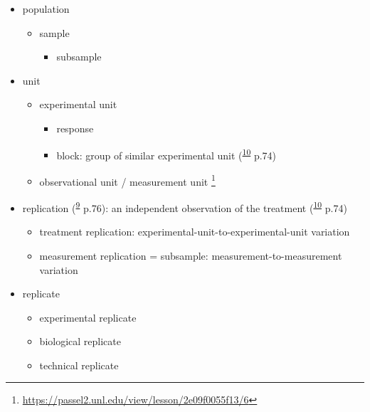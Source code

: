 \documentclass[
]{book}
\providecommand{\tightlist}{%
  \setlength{\itemsep}{0pt}\setlength{\parskip}{0pt}}
\theoremstyle{definition}
\theoremstyle{definition}
\theoremstyle{definition}
\theoremstyle{definition}
\theoremstyle{remark}
\begin{document}
\begin{itemize}
\tightlist
\item
  population

  \begin{itemize}
  \tightlist
  \item
    sample

    \begin{itemize}
    \tightlist
    \item
      subsample
    \end{itemize}
  \end{itemize}
\item
  unit

  \begin{itemize}
  \tightlist
  \item
    experimental unit

    \begin{itemize}
    \tightlist
    \item
      response
    \item
      block: group of similar experimental unit (\textsuperscript{\protect\hyperlink{ref-milliken2004}{10}} p.74)
    \end{itemize}
  \item
    observational unit / measurement unit \footnote{\url{https://passel2.unl.edu/view/lesson/2e09f0055f13/6}}
  \end{itemize}
\item
  replication (\textsuperscript{\protect\hyperlink{ref-hu2022}{9}} p.76): an independent observation of the treatment (\textsuperscript{\protect\hyperlink{ref-milliken2004}{10}} p.74)

  \begin{itemize}
  \tightlist
  \item
    treatment replication: experimental-unit-to-experimental-unit variation
  \item
    measurement replication = subsample: measurement-to-measurement variation
  \end{itemize}
\item
  replicate

  \begin{itemize}
  \tightlist
  \item
    experimental replicate
  \item
    biological replicate
  \item
    technical replicate
  \end{itemize}
\end{itemize}
\end{document}

